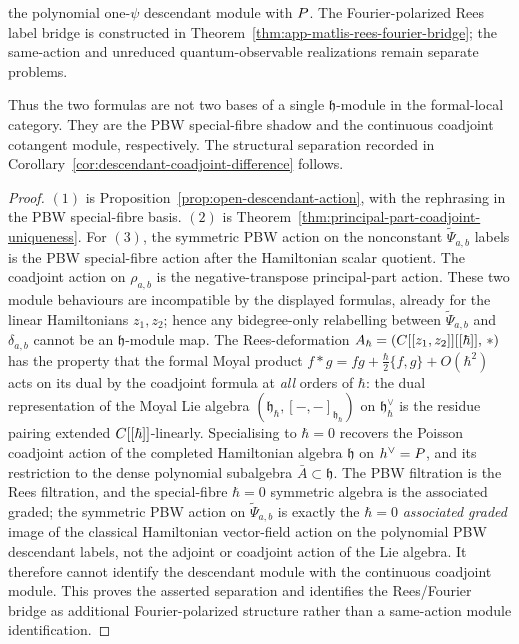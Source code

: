 \documentclass[11pt]{memoir}
\begin{document}
\begin{thm}
\begin{enumerate}
	      the polynomial one-$\psi$ descendant module with $P$.
	      The Fourier-polarized Rees label bridge is constructed in
	      Theorem~\ref{thm:app-matlis-rees-fourier-bridge}; the
	      same-action and unreduced quantum-observable realizations remain
	      separate problems.
  \end{enumerate}
  Thus the two formulas are not two bases of a single
  $\mathfrak h$-module in the formal-local category. They are the PBW special-fibre
  shadow and the continuous coadjoint cotangent module, respectively.
  The structural separation recorded in
  Corollary~\ref{cor:descendant-coadjoint-difference} follows.
\end{thm}

\begin{proof}
  $(1)$ is Proposition~\ref{prop:open-descendant-action}, with the
  rephrasing in the PBW special-fibre basis. $(2)$ is
  Theorem~\ref{thm:principal-part-coadjoint-uniqueness}. For $(3)$, the
	  symmetric PBW action on the nonconstant
	  \(\widetilde\Psi_{a,b}\) labels is the PBW special-fibre action after
	  the Hamiltonian scalar quotient. The coadjoint action on
	  $\rho_{a,b}$ is the negative-transpose principal-part action. These two module behaviours are
	  incompatible by the
  displayed formulas, already for the linear
  Hamiltonians $z_1,z_2$; hence any bidegree-only relabelling between
  $\widetilde\Psi_{a,b}$ and $\delta_{a,b}$ cannot be an
  $\mathfrak h$-module map. The Rees-deformation
  $A_\hbar=(C[[z_1,z_2]][[\hbar]],\,*)$ has the property that the
  formal Moyal product
  $f*g=fg+\frac{\hbar}{2}\{f,g\}+O(\hbar^2)$ acts on its dual by the
  coadjoint formula at \emph{all} orders of $\hbar$: the dual
  representation of the Moyal Lie algebra
  $(\mathfrak h_\hbar,[-,-]_{\mathfrak h_\hbar})$ on
  $\mathfrak h_\hbar^\vee$ is the residue pairing extended
  $C[[\hbar]]$-linearly. Specialising to $\hbar=0$ recovers the
  Poisson coadjoint action of the completed Hamiltonian algebra
  $\mathfrak h$ on $h^\vee=P$, and its restriction to the
  dense polynomial subalgebra $\bar A\subset\mathfrak h$. The PBW
  filtration is the Rees filtration,
  and the special-fibre $\hbar=0$ symmetric algebra is the associated
  graded; the symmetric PBW action on $\widetilde\Psi_{a,b}$ is
  exactly the $\hbar=0$ \emph{associated graded} image of the
  classical Hamiltonian vector-field action on the polynomial PBW
  descendant labels, not the
  adjoint or coadjoint action of the Lie algebra. It therefore cannot
  identify the descendant module with the continuous coadjoint module.
  This proves the asserted separation and identifies the Rees/Fourier
	  bridge as additional Fourier-polarized structure rather than a
	  same-action module identification.
\end{proof}
\end{document}
